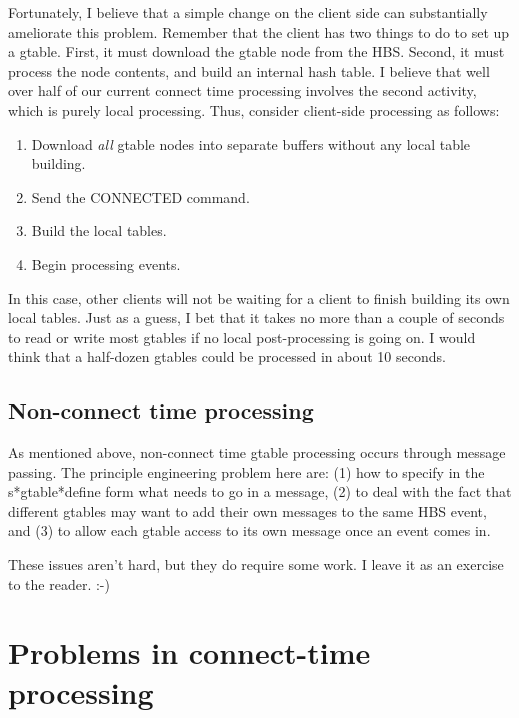 Fortunately, I believe that a simple change on the client side can
substantially ameliorate this problem.  Remember that the client has two
things to do to set up a gtable.  First, it must download the gtable node
from the HBS.  Second, it must process the node contents, and build an
internal hash table.  I believe that well over half of our current connect
time processing involves the second activity, which is purely local
processing.  Thus, consider client-side processing as follows:
\begin{enumerate}
\item Download {\em all} gtable nodes into separate buffers without any
local table building.

\item Send the CONNECTED command.

\item Build the local tables. 

\item Begin processing events. 
\end{enumerate}

In this case, other clients will not be waiting for a client to finish
building its own local tables.  Just as a guess, I bet that it takes no
more than a couple of seconds to read or write most gtables if no local
post-processing is going on.  I would think that a half-dozen gtables could
be processed in about 10 seconds. 

\subsection{Non-connect time processing}

As mentioned above, non-connect time gtable processing occurs through
message passing.  The principle engineering problem here are: (1) how to
specify in the s*gtable*define form what needs to go in a message, (2) to
deal with the fact that different gtables may want to add their own
messages to the same HBS event, and (3) to allow each gtable access to its
own message once an event comes in.

These issues aren't hard, but they do require some work. I leave it as an
exercise to the reader. :-)



\appendix

\newpage
\section{Problems in connect-time processing}

